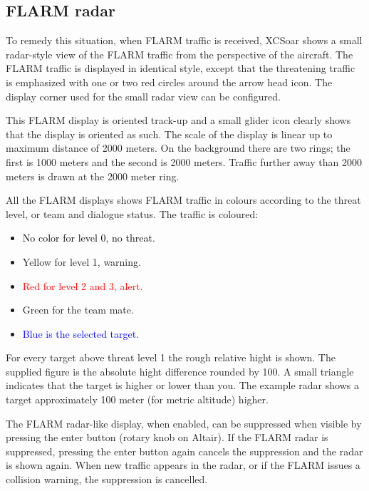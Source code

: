 \subsection*{FLARM radar}

To remedy this situation, when FLARM traffic is received, XCSoar shows a 
small radar-style view of the FLARM
traffic from the perspective of the aircraft.  The FLARM traffic is
displayed in identical style, except that the threatening traffic is emphasized 
with one or two red circles around the arrow head icon.  The display corner used 
for the small radar view can be configured.

This FLARM display is oriented track-up and a small glider icon
clearly shows that the display is oriented as such.  The scale of the
display is linear up to maximum distance of 2000 meters.  On the
background there are two rings; the first is 1000 meters and the second 
is 2000 meters.  Traffic further away than 2000 meters is drawn at the 2000 meter ring.

All the FLARM displays shows FLARM traffic in colours according to
the threat level, or team and dialogue status.  The traffic is coloured:
\begin{itemize}
\item \textcolor{black} {No color for level 0, no threat.} 
\item \textcolor{warning} { Yellow for level 1, warning.}
\item \textcolor{red} {Red for level 2 and 3, alert.}
\item \textcolor{teammate} {Green for the team mate.}
\item \textcolor{blue} {Blue is the selected target.}
\end{itemize}

For every target above threat level 1 the rough relative hight is shown. The
supplied figure is the absolute hight difference rounded by 100.  A small
triangle indicates that the target is higher or lower than you.  The example
radar shows a target approximately 100 meter (for metric altitude) higher.

The FLARM radar-like display, when enabled, can be suppressed when
visible by pressing the enter button (rotary knob on Altair).  If the
FLARM radar is suppressed, pressing the enter button again cancels the
suppression and the radar is shown again.  When new traffic appears in
the radar, or if the FLARM issues a collision warning, the suppression
is cancelled.

